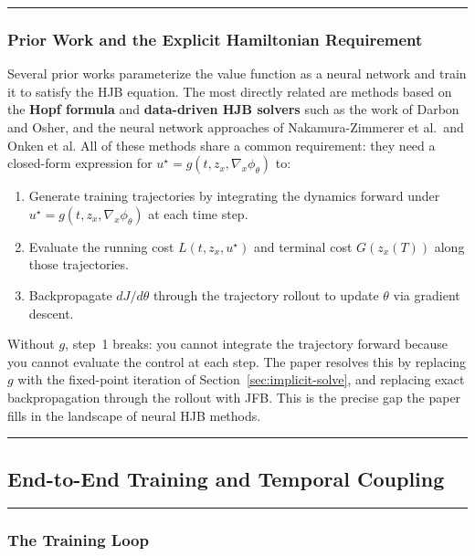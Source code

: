 \documentclass{article}
\begin{document}
\medskip\hrule\medskip

\subsubsection{Prior Work and the Explicit Hamiltonian Requirement}

\begin{extrainfobox}
Several prior works parameterize the value function as a neural network and
train it to satisfy the HJB equation. The most directly related are methods
based on the \textbf{Hopf formula} and \textbf{data-driven HJB solvers} such as
the work of Darbon and Osher, and the neural network approaches of Nakamura-Zimmerer
et al.\ and Onken et al. All of these methods share a common requirement: they
need a closed-form expression for $u^\star = g(t, z_x, \nabla_x\phi_\theta)$ to:

\begin{enumerate}
    \item Generate training trajectories by integrating the dynamics forward
          under $u^\star = g(t, z_x, \nabla_x\phi_\theta)$ at each time step.
    \item Evaluate the running cost $L(t, z_x, u^\star)$ and terminal cost
          $G(z_x(T))$ along those trajectories.
    \item Backpropagate $dJ/d\theta$ through the trajectory rollout to update
          $\theta$ via gradient descent.
\end{enumerate}

Without $g$, step~1 breaks: you cannot integrate the trajectory forward
because you cannot evaluate the control at each step. The paper resolves this
by replacing $g$ with the fixed-point iteration of
Section~\ref{sec:implicit-solve}, and replacing exact backpropagation through
the rollout with JFB. This is the precise gap the paper fills in the landscape
of neural HJB methods.
\end{extrainfobox}

\medskip

\hrule

\subsection{End-to-End Training and Temporal Coupling}
\label{sec:training-temporal-coupling}

\medskip\hrule\medskip

\subsubsection{The Training Loop}
\end{document}
